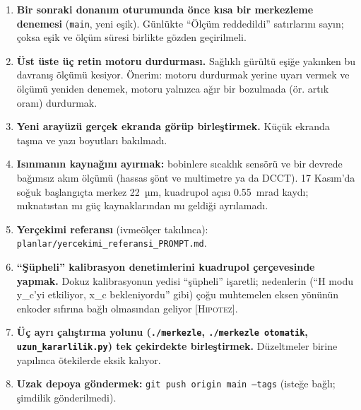 \documentclass[11pt,a4paper]{article}
\newcommand{\kod}[1]{\texttt{#1}}
\newcommand{\hip}{\textsc{[Hipotez]}}
\begin{document}
\begin{enumerate}
\item \textbf{Bir sonraki donanım oturumunda önce kısa bir merkezleme denemesi} (\kod{main}, yeni eşik).
Günlükte ``Ölçüm reddedildi'' satırlarını sayın; çoksa eşik ve ölçüm süresi birlikte gözden geçirilmeli.
\item \textbf{Üst üste üç retin motoru durdurması.} Sağlıklı gürültü eşiğe yakınken bu davranış ölçümü kesiyor.
Önerim: motoru durdurmak yerine uyarı vermek ve ölçümü yeniden denemek, motoru yalnızca ağır bir bozulmada
(ör. artık oranı) durdurmak.
\item \textbf{Yeni arayüzü gerçek ekranda görüp birleştirmek.} Küçük ekranda taşma ve yazı boyutları
bakılmadı.
\item \textbf{Isınmanın kaynağını ayırmak:} bobinlere sıcaklık sensörü ve bir devrede bağımsız akım ölçümü (hassas
şönt ve multimetre ya da DCCT). 17 Kasım'da soğuk başlangıçta merkez 22~µm, kuadrupol açısı 0.55~mrad kaydı;
mıknatıstan mı güç kaynaklarından mı geldiği ayrılamadı.
\item \textbf{Yerçekimi referansı} (ivmeölçer takılınca): \kod{planlar/yercekimi\_referansi\_PROMPT.md}.
\item \textbf{``Şüpheli'' kalibrasyon denetimlerini kuadrupol çerçevesinde yapmak.} Dokuz kalibrasyonun yedisi
``şüpheli'' işaretli; nedenlerin (``H modu y\_c'yi etkiliyor, x\_c bekleniyordu'' gibi) çoğu muhtemelen eksen
yönünün enkoder sıfırına bağlı olmasından geliyor \hip.
\item \textbf{Üç ayrı çalıştırma yolunu (\kod{./merkezle}, \kod{./merkezle otomatik}, \kod{uzun\_kararlilik.py})
tek çekirdekte birleştirmek.} Düzeltmeler birine yapılınca ötekilerde eksik kalıyor.
\item \textbf{Uzak depoya göndermek:} \kod{git push origin main --tags} (isteğe bağlı; şimdilik gönderilmedi).
\end{enumerate}
\end{document}
